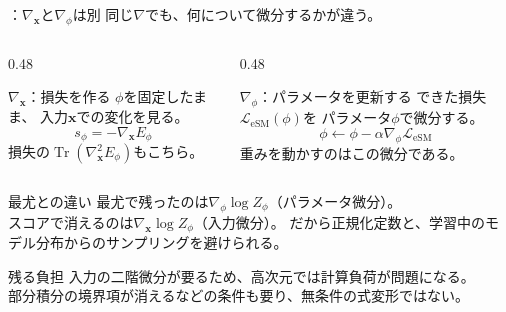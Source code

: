 \begin{frame}{\supplmark：$\nabla_{\bm{x}}$と$\nabla_\phi$は別}
    同じ$\nabla$でも、何について微分するかが違う。
    \vspace{0.15em}
    \begin{columns}[T,onlytextwidth]
        \begin{column}{0.48\textwidth}
            \begin{exampleblock}{$\nabla_{\bm{x}}$：損失を作る}
                $\phi$を固定したまま、
                入力$\bm{x}$での変化を見る。
                \[
                    s_\phi=-\nabla_{\bm{x}}E_\phi
                \]
                損失の$\operatorname{Tr}(\nabla_{\bm{x}}^{2}E_\phi)$もこちら。
            \end{exampleblock}
        \end{column}
        \begin{column}{0.48\textwidth}
            \begin{exampleblock}{$\nabla_\phi$：パラメータを更新する}
                できた損失$\mathcal{L}_{\mathrm{eSM}}(\phi)$を
                パラメータ$\phi$で微分する。
                \[
                    \phi\leftarrow\phi-\alpha\nabla_\phi\mathcal{L}_{\mathrm{eSM}}
                \]
                重みを動かすのはこの微分である。
            \end{exampleblock}
        \end{column}
    \end{columns}
    \vspace{0.2em}
    \begin{exampleblock}{最尤との違い}
        最尤で残ったのは$\nabla_\phi\log Z_\phi$（パラメータ微分）。\\
        スコアで消えるのは$\nabla_{\bm{x}}\log Z_\phi$（入力微分）。
        だから正規化定数と、学習中のモデル分布からのサンプリングを避けられる。
    \end{exampleblock}
    \begin{exampleblock}{残る負担}
        入力の二階微分が要るため、高次元では計算負荷が問題になる。\\
        部分積分の境界項が消えるなどの条件も要り、無条件の式変形ではない。
    \end{exampleblock}
\end{frame}
\assuppl
